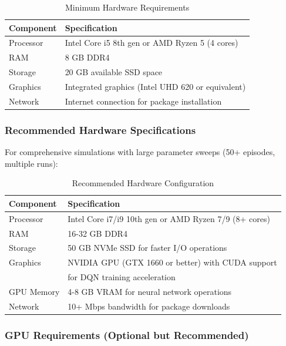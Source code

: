 \documentclass[12pt,a4paper]{article}
\begin{document}
\begin{table}[htbp]
\centering
\caption{Minimum Hardware Requirements}
\label{tab:min_hardware}
\begin{tabular}{|l|l|}
\hline
\textbf{Component} & \textbf{Specification} \\
\hline
Processor & Intel Core i5 8th gen or AMD Ryzen 5 (4 cores) \\
\hline
RAM & 8 GB DDR4 \\
\hline
Storage & 20 GB available SSD space \\
\hline
Graphics & Integrated graphics (Intel UHD 620 or equivalent) \\
\hline
Network & Internet connection for package installation \\
\hline
\end{tabular}
\end{table}

\subsubsection{Recommended Hardware Specifications}

For comprehensive simulations with large parameter sweeps (50+ episodes, multiple runs):

\begin{table}[htbp]
\centering
\caption{Recommended Hardware Configuration}
\label{tab:rec_hardware}
\begin{tabular}{|l|l|}
\hline
\textbf{Component} & \textbf{Specification} \\
\hline
Processor & Intel Core i7/i9 10th gen or AMD Ryzen 7/9 (8+ cores) \\
\hline
RAM & 16-32 GB DDR4 \\
\hline
Storage & 50 GB NVMe SSD for faster I/O operations \\
\hline
Graphics & NVIDIA GPU (GTX 1660 or better) with CUDA support \\
& for DQN training acceleration \\
\hline
GPU Memory & 4-8 GB VRAM for neural network operations \\
\hline
Network & 10+ Mbps bandwidth for package downloads \\
\hline
\end{tabular}
\end{table}

\subsubsection{GPU Requirements (Optional but Recommended)}
\end{document}
